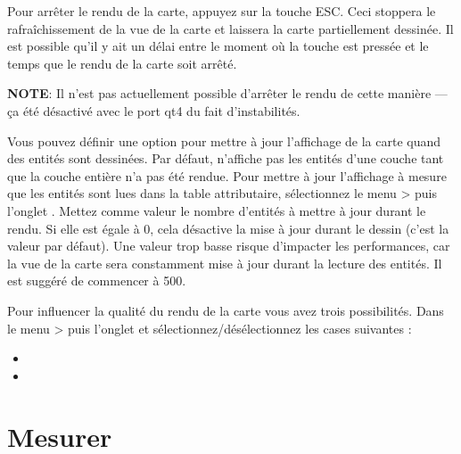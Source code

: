 Pour arrêter le rendu de la carte, appuyez sur la touche ESC. Ceci stoppera le rafraîchissement de la vue de la carte et laissera la carte partiellement dessinée. Il est possible qu'il y ait un délai entre le moment où la touche est pressée et le temps que le rendu de la carte soit arrêté.

\textbf{NOTE}: Il n'est pas actuellement possible d'arrêter le rendu de cette manière — ça été désactivé avec le port qt4 du fait d'instabilités.

\label{label_updatemap}

Vous pouvez définir une option pour mettre à jour l'affichage de la carte quand des entités sont dessinées. Par défaut, \qg n'affiche pas les entités d'une couche tant que la couche entière n'a pas été rendue. Pour mettre à jour l'affichage à mesure que les entités sont lues dans la table attributaire, sélectionnez le menu  >  puis l'onglet . Mettez comme valeur le nombre d'entités à mettre à jour durant le rendu. Si elle est égale à 0, cela désactive la mise à jour durant le dessin (c'est la valeur par défaut). Une valeur trop basse risque d'impacter les performances, car la vue de la carte sera constamment mise à jour durant la lecture des entités. Il est suggéré de commencer à 500.

\label{label_renderquality}

Pour influencer la qualité du rendu de la carte vous avez trois possibilités. Dans le menu  >  puis l'onglet  et sélectionnez/désélectionnez les cases suivantes :
\begin{itemize}[label=--]
\item {}
\item {}
\end{itemize}

\section{Mesurer}\label{sec:measure}

